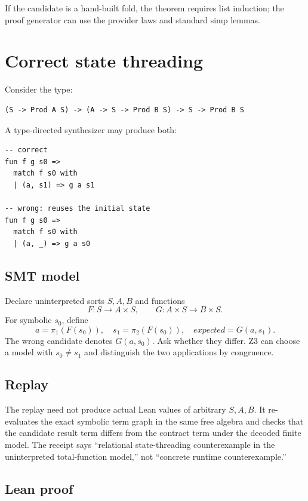 \documentclass[11pt,oneside]{report}
\begin{document}
If the candidate is a hand-built fold, the theorem requires list induction; the proof generator can use the provider laws and standard simp lemmas.

\section{Correct state threading}
\label{sec:example-state}

Consider the type:

\begin{lstlisting}[language=LeanX]
(S -> Prod A S) -> (A -> S -> Prod B S) -> S -> Prod B S
\end{lstlisting}

A type-directed synthesizer may produce both:

\begin{lstlisting}[language=LeanX,caption={Correct and incorrect inhabitants of the same state-bind type.}]
-- correct
fun f g s0 =>
  match f s0 with
  | (a, s1) => g a s1

-- wrong: reuses the initial state
fun f g s0 =>
  match f s0 with
  | (a, _) => g a s0
\end{lstlisting}

\subsection{SMT model}

Declare uninterpreted sorts $S,A,B$ and functions
\[
F:S\to A\times S,\qquad G:A\times S\to B\times S.
\]
For symbolic $s_0$, define
\[
 a=\pi_1(F(s_0)),\quad s_1=\pi_2(F(s_0)),\quad
 expected=G(a,s_1).
\]
The wrong candidate denotes $G(a,s_0)$. Ask whether they differ. Z3 can choose a model with $s_0\ne s_1$ and distinguish the two applications by congruence.

\subsection{Replay}

The replay need not produce actual Lean values of arbitrary $S,A,B$. It re-evaluates the exact symbolic term graph in the same free algebra and checks that the candidate result term differs from the contract term under the decoded finite model. The receipt says ``relational state-threading counterexample in the uninterpreted total-function model,'' not ``concrete runtime counterexample.''

\subsection{Lean proof}
\end{document}
